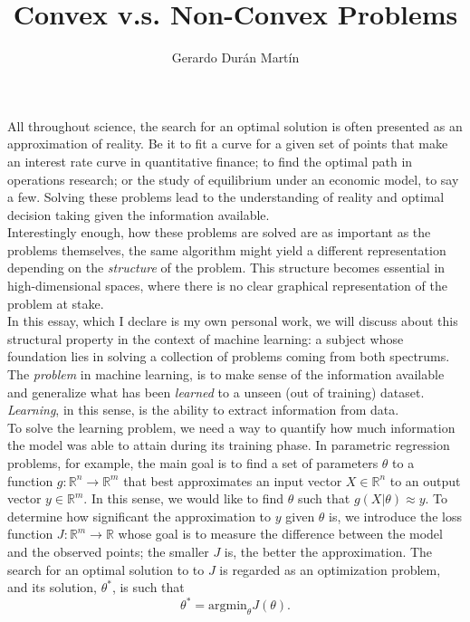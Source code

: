 \documentclass{article}
\title{Convex v.s. Non-Convex Problems}
\author{Gerardo Durán Martín}
\newcommand{\rnums}{\mathbb{R}}
\begin{document}
	\maketitle
	
	All throughout science, the search for an optimal solution is often presented as an approximation of reality. Be it to fit a curve for a given set of points that make an interest rate curve in quantitative finance; to find the optimal path in operations research; or the study of equilibrium under an economic model, to say a few. Solving these problems lead to the understanding of reality and optimal decision taking given the information available.\\
	
	Interestingly enough, how these problems are solved are as important as the problems themselves, the same algorithm might yield a different representation depending on the \textit{structure} of the problem. This structure becomes essential in high-dimensional spaces, where there is no clear graphical representation of the problem at stake.\\
	
	In this essay, which I declare is my own personal work, we will discuss about this structural property in the context of machine learning: a subject whose foundation lies in solving a collection of problems coming from both spectrums.\\
	
	 The \textit{problem} in machine learning, is to make sense of the information available and generalize what has been \textit{learned} to a unseen (out of training) dataset. \textit{Learning}, in this sense, is the ability to extract information from data.\\
	
	To solve the learning problem, we need a way to quantify how much information the model was able to attain during its training phase. In parametric regression problems, for example, the main goal is to find a set of parameters $\theta$ to a function $g:\rnums^n\to\rnums^m$ that best approximates an input vector $X\in\rnums^n$ to an output vector $y\in\rnums^m$. In this sense, we would like to find $\theta$ such that $g(X|\theta) \approx y$. To determine how significant the approximation to $y$ given $\theta$ is, we introduce the loss function $J: \rnums^m \to \rnums$ whose goal is to measure the difference between the model and the observed points; the smaller $J$ is, the better the approximation. The search for an optimal solution to to $J$ is regarded as an optimization problem, and its solution, $\theta^*$, is such that	
	\begin{equation}\label{eq:opt_solution}
		\theta^* = \text{argmin}_\theta  J(\theta).
	\end{equation}
	
\end{document}
